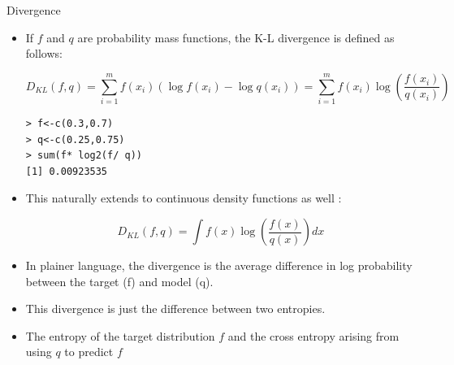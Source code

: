 \documentclass[handout]{beamer}
\begin{document}
\begin{frame}[fragile]{Divergence}
\scriptsize{

\begin{itemize}



\item If $f$ and $q$ are probability mass functions, the K-L divergence is defined as follows:

\begin{equation}
 D_{KL}(f,q) = \sum_{i=1}^m f(x_i)(\log f(x_i)-\log q(x_i)) = \sum_{i=1}^m f(x_i)\log \left(\frac{f(x_i)}{q(x_i)}\right)
\end{equation}

\begin{verbatim}
> f<-c(0.3,0.7)
> q<-c(0.25,0.75)
> sum(f* log2(f/ q)) 
[1] 0.00923535 
\end{verbatim}


\item This naturally extends to continuous density functions as well \cite{pml1Book}:

\begin{equation}
 D_{KL}(f,q) = \int f(x)\log \left(\frac{f(x)}{q(x)}\right)dx
\end{equation}


\item In plainer language, the divergence is the average difference in log probability between the target (f) and model (q). 

\item This divergence is just the difference between two entropies.

\item The entropy of the target distribution $f$ and the cross entropy arising from using $q$ to predict $f$

\end{itemize}


} 
\end{frame}
\end{document}
